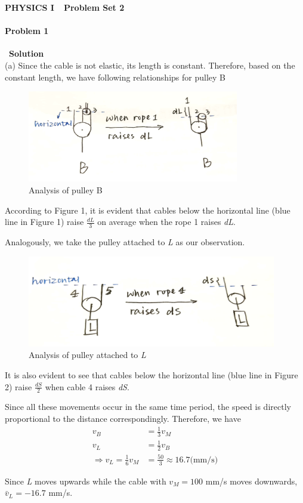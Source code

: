 \documentclass[12pt,a4paper]{article}
\begin{document}
\centerline{\Huge{{\textbf{PHYSICS I\ \ Problem Set 2}}}}
\vspace{0.5cm}
\paragraph{\large \textbf{Problem 1}}~{\textbf{Solution}}
\vspace{2mm}\\
\noindent (a) Since the cable is not elastic, its length is constant. Therefore, based on the constant length, we have following relationships for pulley B
\begin{figure}[H]
    \centering
    \includegraphics[height = 4cm]{1.jpg}
    \caption{Analysis of pulley B}
\end{figure}
\par According to Figure 1, it is evident that cables below the horizontal line (blue line in Figure 1) raise $\frac{dL}{3}$ on average when the rope 1 raises \textit{dL}.
\par Analogously, we take the pulley attached to \textit{L} as our observation.
\begin{figure}[H]
    \centering
    \includegraphics[height = 4cm]{2.jpg}
    \caption{Analysis of pulley attached to \textit{L}}
\end{figure}
\par It is also evident to see that cables below the horizontal line (blue line in Figure 2) raise $\frac{dS}{2}$ when cable 4 raises \textit{dS}.
\par Since all these movements occur in the same time period, the speed is directly proportional to the distance correspondingly. Therefore, we have
\begin{align*}
	v_B &= \frac{1}{3} v_M\\
	v_L &= \frac{1}{2} v_B\\
	\Rightarrow v_L = \frac{1}{6} v_M &= \frac{50}{3} \approx 16.7 \text{(mm/s)}
\end{align*}
\par Since \textit{L} moves upwards while the cable with $v_M = 100$ mm/s moves downwards, $\bar{v}_L = -16.7$ mm/s.
\end{document}
